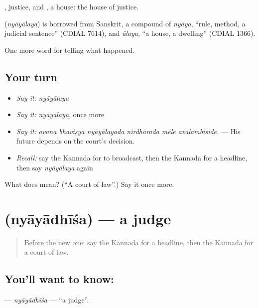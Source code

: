 , justice, and , a house: the house of justice.

\begin{cousinweb}
\textbf{} (\emph{nyāyālaya}) is borrowed from Sanskrit, a compound of \emph{nyāya}, \textquotedblleft{}rule, method, a judicial sentence\textquotedblright{} (CDIAL 7614), and \emph{ālaya}, \textquotedblleft{}a house, a dwelling\textquotedblright{} (CDIAL 1366).
\end{cousinweb}

\begin{grammarlens}[title={What you've built}]
One more word for telling what happened.
\end{grammarlens}

\subsection*{Your turn}
\begin{itemize}
\raggedright
  \item \emph{Say it:} \emph{nyāyālaya}
  \item \emph{Say it:} \emph{nyāyālaya}, once more
  \item \emph{Say it:} \emph{avana bhaviṣya nyāyālayada nirdhārada mēle avalambiside.} — His future depends on the court's decision.
  \item \emph{Recall:} say the Kannada for to broadcast, then the Kannada for a headline, then say \emph{nyāyālaya} again
\end{itemize}

\begin{tcolorbox}[breakable,colback=teal!4,colframe=teal!35!black,title={Before you move on}]
What does  mean? (\textquotedblleft{}A court of law\textquotedblright{}.) Say it once more.
\end{tcolorbox}
\section[\texorpdfstring{\kn{ನ್ಯಾಯಾಧೀಶ} (nyāyādhīśa)}{ನ್ಯಾಯಾಧೀಶ (nyāyādhīśa)}]{ (nyāyādhīśa) — a judge}

\label{lesson:KA-C321-nyayadhisa}



\begin{quote}
Before the new one: say the Kannada for a headline, then the Kannada for a court of law.
\end{quote}

\subsection*{You'll want to know: }
\textbf{} — \emph{nyāyādhīśa} — \textquotedblleft{}a judge\textquotedblright{}.

